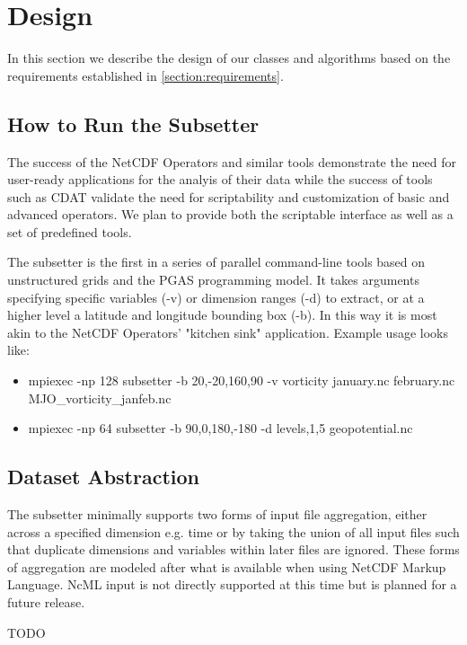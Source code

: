 \section{Design}
\label{section:design}

In this section we describe the design of our classes and algorithms based on
the requirements established in \ref{section:requirements}.

\subsection{How to Run the Subsetter}

The success of the NetCDF Operators and similar tools demonstrate the need for
user-ready applications for the analyis of their data while the success of
tools such as CDAT validate the need for scriptability and customization of
basic and advanced operators.  We plan to provide both the scriptable
interface as well as a set of predefined tools.

The subsetter is the first in a series of parallel command-line tools based on
unstructured grids and the PGAS programming model.  It takes arguments
specifying specific variables (-v) or dimension ranges (-d) to extract, or at
a higher level a latitude and longitude bounding box (-b).  In this way it is
most akin to the NetCDF Operators' "kitchen sink" application.  Example usage
looks like:
\begin{itemize}
\item mpiexec -np 128 subsetter -b 20,-20,160,90 -v vorticity january.nc february.nc MJO\_vorticity\_janfeb.nc
\item mpiexec -np 64 subsetter -b 90,0,180,-180 -d levels,1,5 geopotential.nc
\end{itemize}

\subsection{Dataset Abstraction}

The subsetter minimally supports two forms of input file aggregation, either
across a specified dimension e.g. time or by taking the union of all input
files such that duplicate dimensions and variables within later files are
ignored.  These forms of aggregation are modeled after what is available when
using NetCDF Markup Language.\cite{NcML} NcML input is not directly supported
at this time but is planned for a future release. 

TODO

